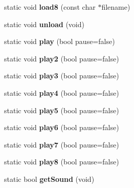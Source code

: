 \begin{DoxyCompactItemize}
\item 
\hypertarget{class_sound_a6ca2c40b47e596896d362f55365e7d44}{static void {\bfseries load8} (const char $\ast$filename)}\label{class_sound_a6ca2c40b47e596896d362f55365e7d44}

\item 
\hypertarget{class_sound_ad2aec8a4c1317e11d6cfb1d59b68696f}{static void {\bfseries unload} (void)}\label{class_sound_ad2aec8a4c1317e11d6cfb1d59b68696f}

\item 
\hypertarget{class_sound_a7d1bbc63d18011e15abf0f395f06069f}{static void {\bfseries play} (bool pause=false)}\label{class_sound_a7d1bbc63d18011e15abf0f395f06069f}

\item 
\hypertarget{class_sound_a142144dd15b4c646fccc13da23ab9186}{static void {\bfseries play2} (bool pause=false)}\label{class_sound_a142144dd15b4c646fccc13da23ab9186}

\item 
\hypertarget{class_sound_a0b6d3e972dc1f161be6478f34b2dee17}{static void {\bfseries play3} (bool pause=false)}\label{class_sound_a0b6d3e972dc1f161be6478f34b2dee17}

\item 
\hypertarget{class_sound_a182b0bbe5ad42601b8722102c87c16f1}{static void {\bfseries play4} (bool pause=false)}\label{class_sound_a182b0bbe5ad42601b8722102c87c16f1}

\item 
\hypertarget{class_sound_a621ffc288e14a3309e377bf3870714f2}{static void {\bfseries play5} (bool pause=false)}\label{class_sound_a621ffc288e14a3309e377bf3870714f2}

\item 
\hypertarget{class_sound_accf7b7b8be160031aff08424dd90bb70}{static void {\bfseries play6} (bool pause=false)}\label{class_sound_accf7b7b8be160031aff08424dd90bb70}

\item 
\hypertarget{class_sound_a1d6c85fb7ef6546e52174042d77ec5f8}{static void {\bfseries play7} (bool pause=false)}\label{class_sound_a1d6c85fb7ef6546e52174042d77ec5f8}

\item 
\hypertarget{class_sound_a10c88e021e26a91b16f80c985d6a1192}{static void {\bfseries play8} (bool pause=false)}\label{class_sound_a10c88e021e26a91b16f80c985d6a1192}

\item 
\hypertarget{class_sound_ac8ab6e621f20b96174020a974a2f3fd3}{static bool {\bfseries get\-Sound} (void)}\label{class_sound_ac8ab6e621f20b96174020a974a2f3fd3}


\end{DoxyCompactItemize}
